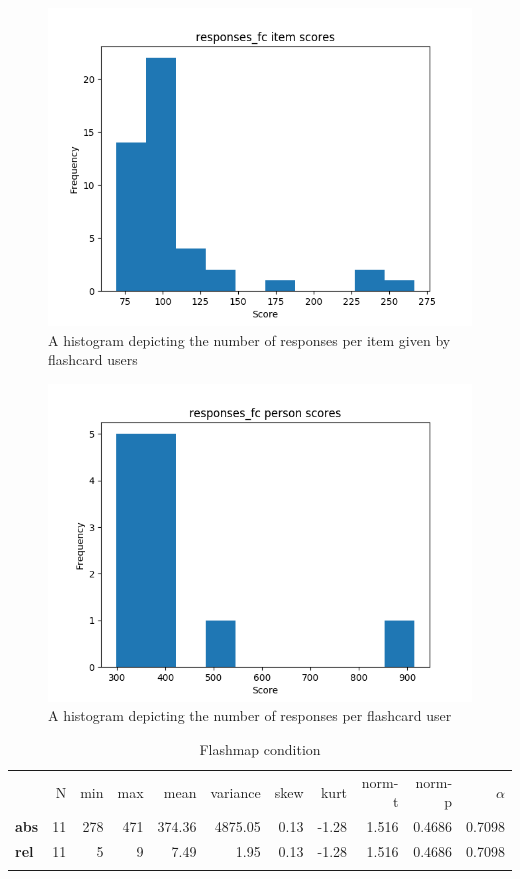 \begin{figure}
    \includegraphics[width=\textwidth]{img/responses_fc_diff.png}
    \caption{A histogram depicting the number of responses per item given by flashcard users}
    \label{fig:responses_fc_diff}
\end{figure}
\begin{figure}
    \includegraphics[width=\textwidth]{img/responses_fc_abil.png}
    \caption{A histogram depicting the number of responses per flashcard user}
    \label{fig:responses_fc_abil}
\end{figure}

\begin{longtable}[c]{@{}lrrrrrrrrrr@{}}
\caption{Flashmap condition}
\endfirsthead
\toprule\addlinespace
& N & min & max & mean & variance & skew & kurt & norm-t &
norm-p & $\alpha$
\\\addlinespace
\midrule
\textbf{abs} & 11 & 278 & 471 & 374.36 & 4875.05 & 0.13 & -1.28 & 1.516
& 0.4686 & 0.7098
\\\addlinespace
\textbf{rel} & 11 & 5 & 9 & 7.49 & 1.95 & 0.13 & -1.28 & 1.516 & 0.4686
& 0.7098
\\\addlinespace
\bottomrule
    \label{tab:responses_fm}
\end{longtable}

